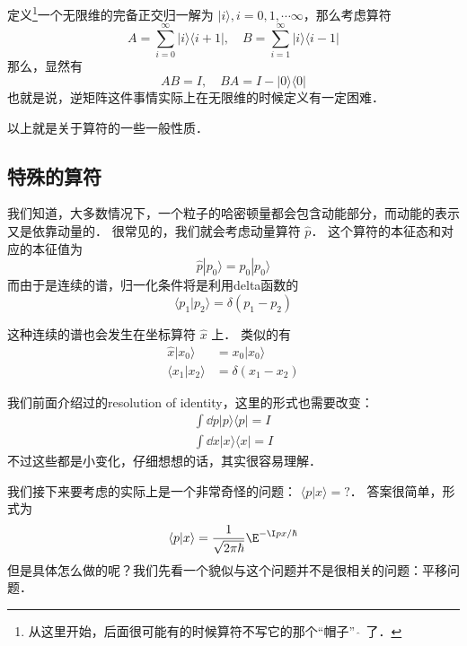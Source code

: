 \begin{exam}{}
定义\footnote{从这里开始，后面很可能有的时候算符不写它的那个“帽子” $\hat{\ }$ 了．}一个无限维的完备正交归一解为 $|i\rangle, i = 0, 1, \cdots \infty$，那么考虑算符
\begin{equation}
A =  \sum_{i = 0}^{\infty} |i\rangle\langle i+1|,\quad B = \sum_{i = 1}^{\infty}|i\rangle\langle i-1|
\end{equation}
那么，显然有
\begin{equation}
AB = I,\quad BA = I - |0\rangle\langle0|
\end{equation}
也就是说，逆矩阵这件事情实际上在无限维的时候定义有一定困难．
\end{exam}

以上就是关于算符的一些一般性质．

\subsection{特殊的算符}

我们知道，大多数情况下，一个粒子的哈密顿量都会包含动能部分，而动能的表示又是依靠动量的． 很常见的，我们就会考虑动量算符 $\hat p$． 这个算符的本征态和对应的本征值为
\begin{equation}
\hat p|p_0\rangle = p_0 |p_0\rangle
\end{equation}
而由于是连续的谱，归一化条件将是利用delta函数的
\begin{equation}
\langle p_1|p_2\rangle = \delta(p_1-p_2)
\end{equation}

这种连续的谱也会发生在坐标算符 $\hat x$ 上． 类似的有
\begin{align}
\hat x|x_0\rangle &= x_0 |x_0\rangle\\
\langle x_1|x_2\rangle &= \delta(x_1-x_2)
\end{align}

我们前面介绍过的resolution of identity，这里的形式也需要改变：
\begin{gather}
\int \dd{p}|p\rangle\langle p| = I\\
\int \dd{x}|x\rangle\langle x| = I
\end{gather}
不过这些都是小变化，仔细想想的话，其实很容易理解．

我们接下来要考虑的实际上是一个非常奇怪的问题： $\langle p|x\rangle = ?$． 答案很简单，形式为
\begin{equation}
\langle p|x\rangle = \frac{1}{\sqrt{2\pi \hbar}}\E^{-\I px/\hbar}
\end{equation}
但是具体怎么做的呢？我们先看一个貌似与这个问题并不是很相关的问题：平移问题．

